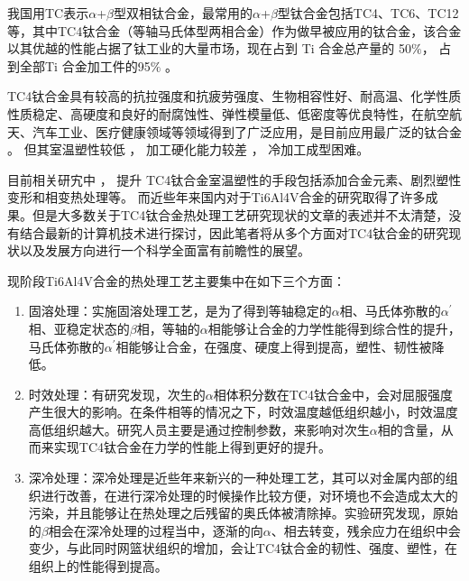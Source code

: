 \documentclass[
class = book,
zihao = -4,
font = noto,
paper = a4paper,
openany
]{easybook}
\newcommand{\ti}{Ti6Al4V}
\begin{document}
我国用TC表示$\alpha $+$\beta $型双相钛合金，最常用的$\alpha $+$\beta $型钛合金包括TC4、TC6、TC12等，其中TC4钛合金（等轴马氏体型两相合金）作为做早被应用的钛合金，该合金以其优越的性能占据了钛工业的大量市场，现在占到 Ti 合金总产量的 50$ \%  $， 占到全部Ti 合金加工件的95$ \% $ 。

TC4钛合金具有较高的抗拉强度和抗疲劳强度、生物相容性好、耐高温、化学性质性质稳定、高硬度和良好的耐腐蚀性、弹性模量低、低密度等优良特性，在航空航天、汽车工业、医疗健康领域等领域得到了广泛应用，是目前应用最广泛的钛合金 。 但其室温塑性较低 ， 加工硬化能力较差 ， 冷加工成型困难。

 目前相关研宄中 ， 提升 TC4钛合金室温塑性的手段包括添加合金元素、剧烈塑性变形和相变热处理等。 而近些年来国内对于\ti 合金的研究取得了许多成果\cite{tc42021}。但是大多数关于TC4钛合金热处理工艺研究现状的文章的表述并不太清楚，没有结合最新的计算机技术进行探讨，因此笔者将从多个方面对TC4钛合金的研究现状以及发展方向进行一个科学全面富有前瞻性的展望。

现阶段\ti 合金的热处理工艺主要集中在如下三个方面：
\begin{enumerate}
	\item 固溶处理：实施固溶处理工艺，是为了得到等轴稳定的$\alpha $相、马氏体弥散的$ \alpha ^{'} $相、亚稳定状态的$\beta $相，等轴的$\alpha $相能够让合金的力学性能得到综合性的提升，马氏体弥散的$ \alpha ^{'} $相能够让合金，在强度、硬度上得到提高，塑性、韧性被降低\cite{gurong2002}。
	\item 时效处理：有研究\cite{timing}发现，次生的$\alpha $相体积分数在TC4钛合金中，会对屈服强度产生很大的影响。在条件相等的情况之下，时效温度越低组织越小，时效温度高低组织越大。研究人员主要是通过控制参数，来影响对次生$\alpha $相的含量，从而来实现TC4钛合金在力学的性能上得到更好的提升。
	\item 深冷处理：深冷处理是近些年来新兴的一种处理工艺，其可以对金属内部的组织进行改善，在进行深冷处理的时候操作比较方便，对环境也不会造成太大的污染，并且能够让在热处理之后残留的奥氏体被清除掉。实验研究发现，原始的$\beta $相会在深冷处理的过程当中，逐渐的向$\alpha $、相去转变，残余应力在组织中会变少，与此同时网篮状组织的增加，会让TC4钛合金的韧性、强度、塑性，在组织上的性能得到提高。
\end{enumerate}

%
%
\end{document}
